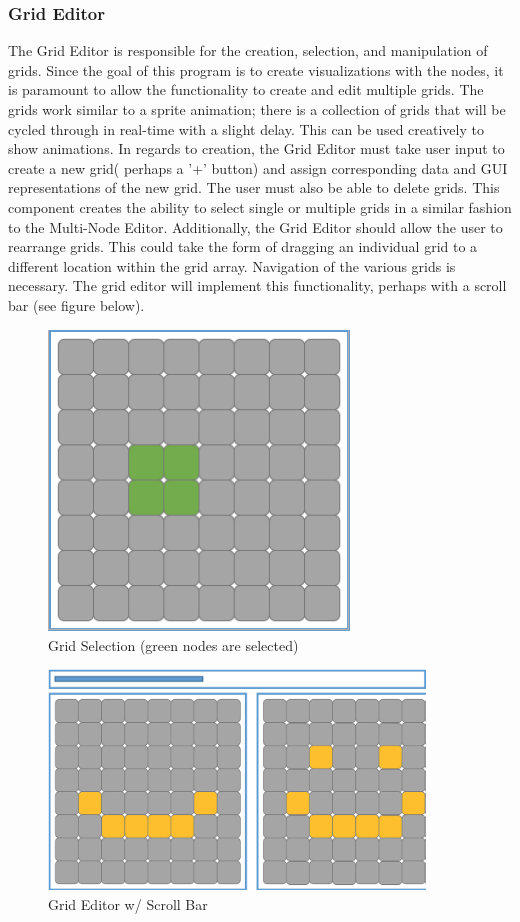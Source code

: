 \documentclass[12pt]{article}
\begin{document}
	\subsubsection {Grid Editor}
  	The Grid Editor is responsible for the creation, selection, and manipulation of grids. Since the goal of this program is to create visualizations with the nodes, it is paramount to allow the functionality to create and edit multiple grids. The grids work similar to a sprite animation; there is a collection of grids that will be cycled through in real-time with a slight delay. This can be used creatively to show animations.  	
  	In regards to creation, the Grid Editor must take user input to create a new grid( perhaps a '+' button) and assign corresponding data and GUI representations of the new grid. The user must also be able to delete grids. This component creates the ability to select single or multiple grids in a similar fashion to the Multi-Node Editor.  	
  	Additionally, the Grid Editor should allow the user to rearrange grids. This could take the form of dragging an individual grid to a different location within the grid array. Navigation of the various grids is necessary. The grid editor will implement this functionality, perhaps with a scroll bar (see figure below).	
  	\begin{figure}[ht!]
  		\centering
  		\includegraphics[width=80mm]{Grid.png}
  		\caption{Grid Selection (green nodes are selected)}
  	\end{figure}
  	
  	\begin{figure}[ht!]
  		\centering
  		\includegraphics[width=100mm]{Multi-grid.png}
  		\caption{Grid Editor w/ Scroll Bar}
  	\end{figure}
	\clearpage	
	
\end{document}
